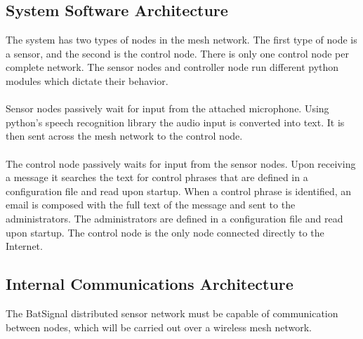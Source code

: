 \documentclass[11pt,a4paper]{article}
\begin{document}
\subsection{System Software Architecture}
The system has two types of nodes in the mesh network.  The first type of node is a sensor, and the second is the control node.  There is only one control node per complete network.  The sensor nodes and controller node run different python modules which dictate their behavior. \\\\
Sensor nodes passively wait for input from the attached microphone.  Using python's speech recognition library the audio input is converted into text.  It is then sent across the mesh network to the control node. \\\\
The control node passively waits for input from the sensor nodes. Upon receiving a message it searches the text for control phrases that are defined in a configuration file and read upon startup. When a control phrase is identified, an email is composed with the full text of the message and sent to the administrators.  The administrators are defined in a configuration file and read upon startup.  The control node is the only node connected directly to the Internet.


\subsection{Internal Communications Architecture}
The BatSignal distributed sensor network must be capable of communication between nodes, which will be carried out over a wireless mesh network. 
\end{document}
